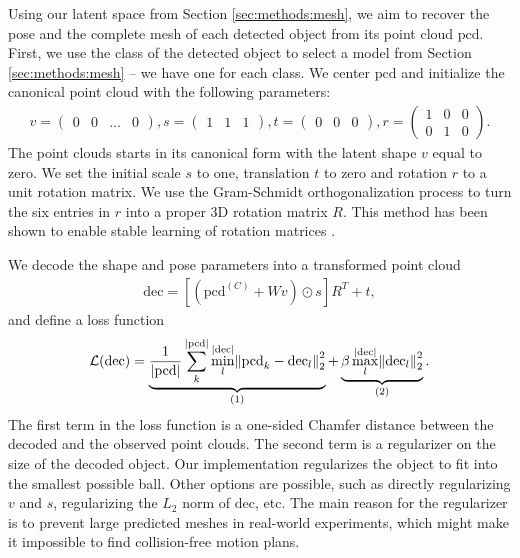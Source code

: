\documentclass{article}
\newcommand{\pcx}[1]{\mathrm{pcd}^{(#1)}}
\newcommand{\pcc}{\pcx{C}}
\begin{document}
Using our latent space from Section \ref{sec:methods:mesh}, we aim to recover the pose and the complete mesh of each detected object from its point cloud $\mathrm{pcd}$. First, we use the class of the detected object to select a model from Section \ref{sec:methods:mesh} -- we have one for each class. We center $\mathrm{pcd}$ and initialize the canonical point cloud with the following parameters:
\begin{align}
    v = \begin{pmatrix} 0 & 0 & ... & 0 \end{pmatrix}, s = \begin{pmatrix} 1 & 1 & 1 \end{pmatrix}, t = \begin{pmatrix} 0 & 0 & 0 \end{pmatrix}, r = \begin{pmatrix} 1 & 0 & 0 \\ 0 & 1 & 0 \end{pmatrix}.
\end{align}
The point clouds starts in its canonical form with the latent shape $v$ equal to zero. We set the initial scale $s$ to one, translation $t$ to zero and rotation $r$ to a unit rotation matrix. We use the Gram-Schmidt orthogonalization process to turn the six entries in $r$ into a proper 3D rotation matrix $R$. This method has been shown to enable stable learning of rotation matrices \cite{falorsi18explorations, park22learning}.

We decode the shape and pose parameters into a transformed point cloud
\begin{align}
    \mathrm{dec} = [(\pcc + W v) \odot s] R^T + t,
\end{align}
and define a loss function
\begin{align}
    \mathcal{L}(\mathrm{dec}) = \underbrace{\frac{1}{|\mathrm{pcd}|} \sum_k^{|\mathrm{pcd}|} \min_l^{|\mathrm{dec}|} \norm{\mathrm{pcd}_k - \mathrm{dec}_l}_2^2}_{\text{(1)}} + \underbrace{\beta \max_l^{|\mathrm{dec}|} \norm{\mathrm{dec}_l}_2^2}_{\text{(2)}}.
\end{align}
The first term in the loss function is a one-sided Chamfer distance between the decoded and the observed point clouds. The second term is a regularizer on the size of the decoded object. Our implementation regularizes the object to fit into the smallest possible ball. Other options are possible, such as directly regularizing $v$ and $s$, regularizing the $L_2$ norm of $\mathrm{dec}$, etc. The main reason for the regularizer is to prevent large predicted meshes in real-world experiments, which might make it impossible to find collision-free motion plans.
\end{document}
